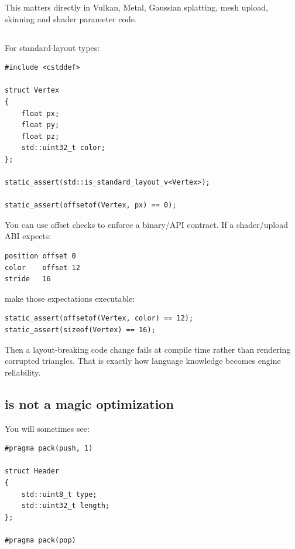 This matters directly in Vulkan, Metal, Gaussian splatting, mesh upload, skinning and shader parameter code.

\subsection{\texorpdfstring{}{offsetof}}\label{05-engine-i-ch003-offsetof}

\hypertarget{05-engine-i-ch003-offsetof}{}

For standard-layout types:

\begin{verbatim}
#include <cstddef>

struct Vertex
{
    float px;
    float py;
    float pz;
    std::uint32_t color;
};

static_assert(std::is_standard_layout_v<Vertex>);

static_assert(offsetof(Vertex, px) == 0);
\end{verbatim}

You can use offset checks to enforce a binary/API contract. If a shader/upload ABI expects:

\begin{verbatim}
position offset 0
color    offset 12
stride   16
\end{verbatim}

make those expectations executable:

\begin{verbatim}
static_assert(offsetof(Vertex, color) == 12);
static_assert(sizeof(Vertex) == 16);
\end{verbatim}

Then a layout-breaking code change fails at compile time rather than rendering corrupted triangles. That is exactly how language knowledge becomes engine reliability.

\subsection{\texorpdfstring{ is not a magic optimization}{\#pragmapack is not a magic optimization}}\label{05-engine-i-ch003-pragma-pack-is-not-a-magic-optimization}

\hypertarget{05-engine-i-ch003-pragma-pack-is-not-a-magic-optimization}{}

You will sometimes see:

\begin{verbatim}
#pragma pack(push, 1)

struct Header
{
    std::uint8_t type;
    std::uint32_t length;
};

#pragma pack(pop)
\end{verbatim}

